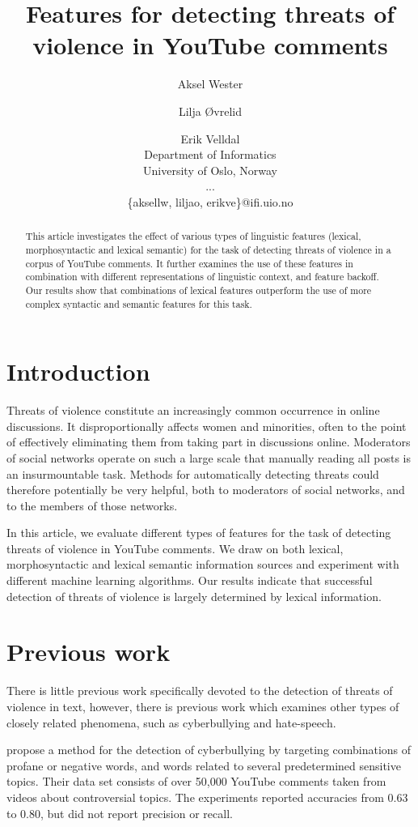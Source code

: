 \documentclass[11pt,letterpaper]{article}
\title{Features for detecting threats of violence in YouTube comments}
\author{Aksel Wester \and Lilja Øvrelid \and Erik Velldal \\
  Department of Informatics \\
  University of Oslo, Norway \\
  ... \\
  \{aksellw, liljao, erikve\}@ifi.uio.no}
\date{}
\begin{document}
\maketitle

\begin{abstract}
This article investigates the effect of various types of linguistic features (lexical, morphosyntactic and lexical semantic) for the task of detecting threats of violence in a corpus of YouTube comments. It further examines the use of these features in combination with different representations of linguistic context, and feature backoff. Our results show that combinations of lexical features outperform the use of more complex syntactic and semantic features for this task.
\end{abstract}

\section{Introduction}
\label{sec:intro}
Threats of violence constitute an increasingly common occurrence in online discussions. It disproportionally affects women and minorities, often to the point of effectively eliminating them from taking part in discussions online. Moderators of social networks operate on such a large scale that manually reading all posts is an insurmountable task. Methods for automatically detecting threats could therefore potentially be very helpful, both to moderators of social networks, and to the members of those networks.

In this article, we evaluate different types of features for the task of detecting threats of violence in YouTube comments. We draw on both lexical, morphosyntactic and lexical semantic information sources and experiment with different machine learning algorithms. Our results indicate that successful detection of threats of violence is largely determined by lexical information.

\section{Previous work}
\label{sec:prev}
There is little previous work specifically devoted to the detection of threats of violence in text, however, there is previous work which examines other types of closely related phenomena, such as cyberbullying and hate-speech.

 propose a method for the detection of cyberbullying by targeting combinations of profane or negative words, and words related to several predetermined sensitive topics. Their data set consists of over 50,000 YouTube comments taken from videos about controversial topics. %
The experiments reported accuracies from 0.63 to 0.80, but did not report precision or recall.
\end{document}
